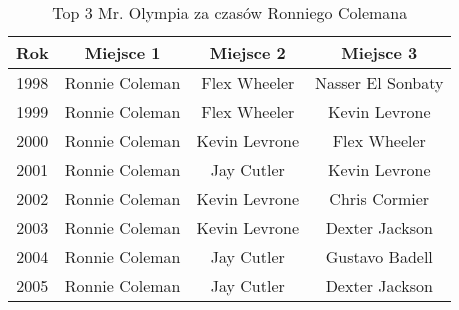 \begin{table}[htbp]
    \centering
    \caption{Top 3 Mr. Olympia za czasów Ronniego Colemana}
    \begin{tabular}{|c|c|c|c|}
        \hline
        \textbf{Rok} & \textbf{Miejsce 1} & \textbf{Miejsce 2} & \textbf{Miejsce 3} \\
        \hline
        1998 & Ronnie Coleman & Flex Wheeler & Nasser El Sonbaty \\
        1999 & Ronnie Coleman & Flex Wheeler & Kevin Levrone \\
        2000 & Ronnie Coleman & Kevin Levrone & Flex Wheeler \\
        2001 & Ronnie Coleman & Jay Cutler & Kevin Levrone \\
        2002 & Ronnie Coleman & Kevin Levrone & Chris Cormier \\
        2003 & Ronnie Coleman & Kevin Levrone & Dexter Jackson \\
        2004 & Ronnie Coleman & Jay Cutler & Gustavo Badell \\
        2005 & Ronnie Coleman & Jay Cutler & Dexter Jackson \\
        \hline
    \end{tabular}
    \label{tab:top3_mrolympia}
\end{table}